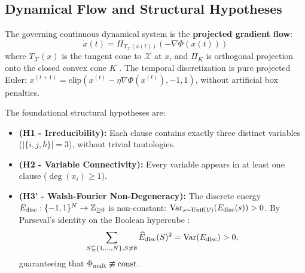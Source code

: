 \documentclass[11pt,a4paper]{article}
\begin{document}
\subsection{Dynamical Flow and Structural Hypotheses}
The governing continuous dynamical system is the \textbf{projected gradient flow}:
\begin{equation}
\dot{x}(t) = \Pi_{T_{\mathcal{X}}(x(t))}\left(-\nabla \Phi(x(t))\right)
\end{equation}
where $T_{\mathcal{X}}(x)$ is the tangent cone to $\mathcal{X}$ at $x$, and $\Pi_K$ is orthogonal projection onto the closed convex cone $K$ \cite{nagurney1996projected}. The temporal discretization is pure projected Euler: $x^{(t+1)} = \text{clip}(x^{(t)} - \eta \nabla \Phi(x^{(t)}), -1, 1)$, without artificial box penalties.

The foundational structural hypotheses are:
\begin{itemize}
    \item \textbf{(H1 - Irreducibility):} Each clause contains exactly three distinct variables ($|\{i, j, k\}| = 3$), without trivial tautologies.
    \item \textbf{(H2 - Variable Connectivity):} Every variable appears in at least one clause ($\deg(x_i) \ge 1$).
    \item \textbf{(H3' - Walsh-Fourier Non-Degeneracy):} The discrete energy $E_{\rm disc}: \{-1, 1\}^N \to \mathbb{Z}_{\ge 0}$ is non-constant: $\text{Var}_{s \sim \text{Unif}(\mathcal{V})}(E_{\rm disc}(s)) > 0$. By Parseval's identity on the Boolean hypercube \cite{odonnell2014analysis}:
    \begin{equation}
    \sum_{S \subseteq \{1, \dots, N\}, S \ne \emptyset} \widehat{E}_{\rm disc}(S)^2 = \text{Var}(E_{\rm disc}) > 0,
    \end{equation}
    guaranteeing that $\Phi_{\rm mult} \not\equiv \text{const}$.
\end{itemize}
\end{document}
